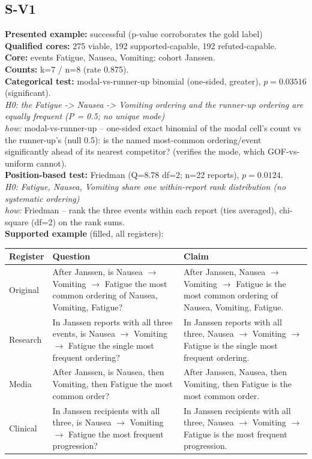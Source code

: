\documentclass[11pt]{article}
\begin{document}
\subsection*{S-V1}
\textbf{Presented example:} successful (p-value corroborates the gold label) \\
\textbf{Qualified cores:} 275 viable, 192 supported-capable, 192 refuted-capable. \\
\textbf{Core:} events Fatigue, Nausea, Vomiting; cohort Janssen. \\
\textbf{Counts:} k=7 / n=8  (rate 0.875). \\
\textbf{Categorical test:} modal-vs-runner-up binomial (one-sided, greater), $p = 0.03516$ (significant). \\
\emph{H0: the Fatigue -> Nausea -> Vomiting ordering and the runner-up ordering are equally frequent (P = 0.5; no unique mode)} \\
\emph{how:} modal-vs-runner-up -- one-sided exact binomial of the modal cell's count vs the runner-up's (null 0.5): is the named most-common ordering/event significantly ahead of its nearest competitor? (verifies the mode, which GOF-vs-uniform cannot). \\
\textbf{Position-based test:} Friedman (Q=8.78 df=2; n=22 reports), $p = 0.0124$. \\
\emph{H0: Fatigue, Nausea, Vomiting share one within-report rank distribution (no systematic ordering)} \\
\emph{how:} Friedman -- rank the three events within each report (ties averaged), chi-square (df=2) on the rank sums. \\
\textbf{Supported example} (filled, all registers): \\
\begin{tabularx}{\linewidth}{@{}l L L@{}}
\toprule
\textbf{Register} & \textbf{Question} & \textbf{Claim} \\
\midrule
Original & After Janssen, is Nausea $\rightarrow$  Vomiting $\rightarrow$  Fatigue the most common ordering of Nausea, Vomiting, Fatigue? & After Janssen, Nausea $\rightarrow$  Vomiting $\rightarrow$  Fatigue is the most common ordering of Nausea, Vomiting, Fatigue. \\
Research & In Janssen reports with all three events, is Nausea $\rightarrow$  Vomiting $\rightarrow$  Fatigue the single most frequent ordering? & In Janssen reports with all three, Nausea $\rightarrow$  Vomiting $\rightarrow$  Fatigue is the single most frequent ordering. \\
Media & After Janssen, is Nausea, then Vomiting, then Fatigue the most common order? & After Janssen, Nausea, then Vomiting, then Fatigue is the most common order. \\
Clinical & In Janssen recipients with all three, is Nausea $\rightarrow$  Vomiting $\rightarrow$  Fatigue the most frequent progression? & In Janssen recipients with all three, Nausea $\rightarrow$  Vomiting $\rightarrow$  Fatigue is the most frequent progression. \\
\bottomrule
\end{tabularx}
\end{document}
